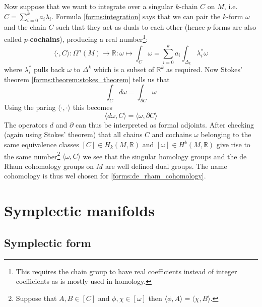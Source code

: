	Now suppose that we want to integrate over a singular $k$-chain $C$ on $M$, i.e. $C = \sum_{i=0}^ka_i\lambda_i$. Formula \ref{forms:integration} says that we can pair the $k$-form $\omega$ and the chain $C$ such that they act as duals to each other (hence $p$-forms are also called $p$-\textbf{cochains}), producing a real number\footnote{This requires the chain group to have real coefficients instead of integer coefficients as is mostly used in homology.}:
	\begin{equation}
		\langle\cdot,C\rangle:\Omega^n(M)\rightarrow\mathbb{R}:\omega\mapsto\int_C\omega = \sum_{i=0}^ka_i\int_{\Delta_k}\lambda_i^{*}\omega
	\end{equation}
	where $\lambda_i^*$ pulls back $\omega$ to $\Delta^k$ which is a subset of $\mathbb{R}^k$ as required. Now Stokes' theorem \ref{forms:theorem:stokes_theorem} tells us that
	\begin{equation}
		\int_Cd\omega = \int_{\partial C}\omega
	\end{equation}
	Using the paring $\langle\cdot,\cdot\rangle$ this becomes
	\begin{equation}
		\langle d\omega, C\rangle = \langle \omega, \partial C\rangle
	\end{equation}
	The operators $d$ and $\partial$ can thus be interpreted as formal adjoints. After checking (again using Stokes' theorem) that all chains $C$ and cochains $\omega$ belonging to the same equivalence classes $[C]\in H_k(M, \mathbb{R})$ and $[\omega]\in H^k(M, \mathbb{R})$ give rise to the same number\footnote{Suppose that $A, B\in [C]$ and $\phi, \chi\in[\omega]$ then $\langle \phi, A \rangle = \langle \chi, B \rangle$.} $\langle\omega, C\rangle$ we see that the singular homology groups and the de Rham cohomology groups on $M$ are well defined dual groups. The name cohomology is thus wel chosen for \ref{forms:de_rham_cohomology}.

\chapter{Symplectic manifolds}
\section{Symplectic form}

	
